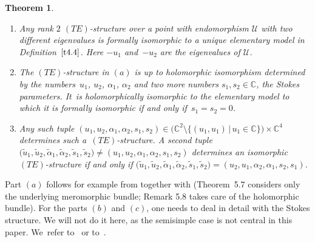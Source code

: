 \documentclass[10pt,a4paper]{amsart}
\numberwithin{equation}{section}
\numberwithin{figure}{section}
\newcommand{\C}{{\mathbb C}}
\newcommand{\UU}{{\mathcal U}}
\newcommand{\www}{\widetilde}
\newtheorem{Theorem}{Theorem}[section]
\begin{document}
\begin{Theorem}\label{t4.5}\qquad

\begin{enumerate}\itemsep=0pt
\item[$(a)$] Any rank $2$ $(TE)$-structure over a point with
endomorphism $\UU$ with two different
eigen\-va\-lues is formally isomorphic to a unique
elementary model in Definition~$\ref{t4.4}$.
Here $-u_1$ and~$-u_2$ are the eigenvalues of $\UU$.

\item[$(b)$] The $(TE)$-structure in $(a)$ is up to holomorphic
isomorphism determined by the numbers~$u_1$, $u_2$, $\alpha_1$, $\alpha_2$ and two more numbers
$s_1,s_2\in\C$, the Stokes parameters. It~is holomorphically isomorphic to the elementary
model to which it is formally isomorphic if and only if~$s_1=s_2=0$.

\item[$(c)$] Any such tuple $(u_1,u_2,\alpha_1,\alpha_2,s_1,s_2)
\in \big(\C^2\setminus \{(u_1,u_1)\,|\, u_1\in\C\}\big)\times\C^4$
determines such a~$(TE)$-structure.
A second tuple $\big(\www u_1,\www u_2,\www\alpha_1,
\www \alpha_2,\www s_1,\www s_2\big)
\neq (u_1,u_2,\alpha_1,\alpha_2,s_1,s_2)$
determines an isomorphic $(TE)$-structure if and only
if $\big(\www u_1,\www u_2,\www\alpha_1,\www \alpha_2,\www s_1,\www s_2\big)
=(u_2,u_1,\alpha_2,\alpha_1,s_2,s_1)$.
\end{enumerate}
\end{Theorem}

Part $(a)$ follows for example from
\cite[Chapter~II, Theorem~5.7]{Sa02} together with
\cite[Chapter~II, Remark 5.8]{Sa02} (Theorem~5.7 considers
only the underlying meromorphic bundle;
Remark 5.8 takes care of the holomorphic bundle).
For the parts $(b)$ and $(c)$, one needs to deal in detail
with the Stokes structure. We will not do it here,
as the semisimple case is not central in this paper.
We~refer to~\cite[Chapter~II, Sections~5 and~6]{Sa02}
or to~\cite{HS11}.
\end{document}
